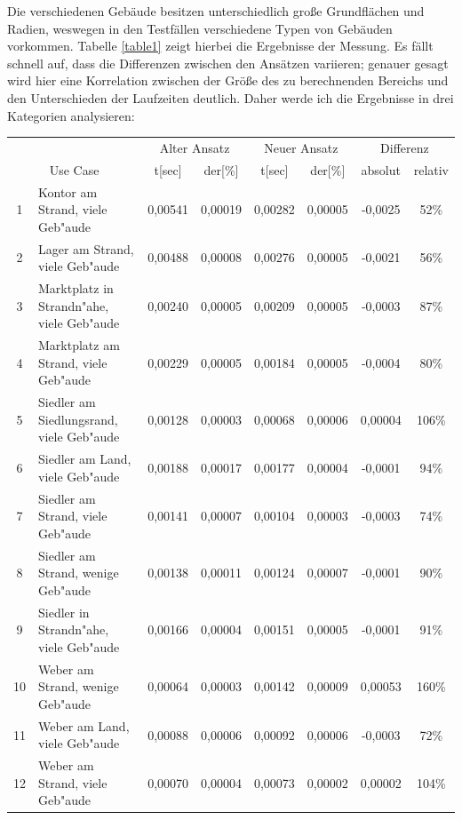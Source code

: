 \documentclass[%
			paper=a4,%
			DIV12,
			liststotoc,
			bibtotoc,
			draft=false,%
			titlepage,
			numbers=noendperiod
			]{scrartcl}
\begin{document}
Die verschiedenen Gebäude besitzen unterschiedlich große Grundflächen und Radien, weswegen
in den Testfällen verschiedene Typen von Gebäuden vorkommen.
Tabelle \ref{table1} zeigt hierbei die Ergebnisse der Messung.
Es fällt schnell auf, dass die Differenzen zwischen den Ansätzen variieren;
genauer gesagt wird hier eine Korrelation zwischen der Größe des zu berechnenden Bereichs und den Unterschieden der Laufzeiten deutlich. Daher werde ich die Ergebnisse in drei Kategorien analysieren:



\begin{center}
	\begin{table}[htpb]
		\begin{tabularx}{\textwidth}{|cX|cc|cc|cc|}
			\hline
			& & \multicolumn{2}{c|}{Alter Ansatz} & \multicolumn{2}{c|}{Neuer Ansatz} & \multicolumn{2}{c|}{Differenz}\\
			\multicolumn{2}{|c|}{Use Case} & t[sec] & der[\%] & t[sec] & der[\%] & absolut & relativ \\
			\hline
1 & Kontor am Strand, viele Geb"aude & 0,00541 & 0,00019 & 0,00282 & 0,00005 & -0,0025 & 52\%\\
2 & Lager am Strand, viele Geb"aude & 0,00488 & 0,00008 & 0,00276 & 0,00005 & -0,0021 & 56\%\\
3 & Marktplatz in Strandn"ahe, viele Geb"aude & 0,00240 & 0,00005 & 0,00209 & 0,00005 & -0,0003 & 87\%\\
4 & Marktplatz am Strand, viele Geb"aude & 0,00229 & 0,00005 & 0,00184 & 0,00005 & -0,0004 & 80\%\\
5 & Siedler am Siedlungsrand, viele Geb"aude & 0,00128 & 0,00003 & 0,00068 & 0,00006 & 0,00004 & 106\%\\
6 & Siedler am Land, viele Geb"aude & 0,00188 & 0,00017 & 0,00177 & 0,00004 & -0,0001 & 94\%\\
7 & Siedler am Strand, viele Geb"aude & 0,00141 & 0,00007 & 0,00104 & 0,00003 & -0,0003 & 74\%\\
8 & Siedler am Strand, wenige Geb"aude & 0,00138 & 0,00011 & 0,00124 & 0,00007 & -0,0001 & 90\%\\
9 & Siedler in Strandn"ahe, viele Geb"aude & 0,00166 & 0,00004 & 0,00151 & 0,00005 & -0,0001 & 91\%\\
10 & Weber am Strand, wenige Geb"aude & 0,00064 & 0,00003 & 0,00142 & 0,00009 & 0,00053 & 160\%\\
11 & Weber am Land, viele Geb"aude & 0,00088 & 0,00006 & 0,00092 & 0,00006 & -0,0003 & 72\%\\
12 & Weber am Strand, viele Geb"aude & 0,00070 & 0,00004 & 0,00073 & 0,00002 & 0,00002 & 104\%\\


\end{tabularx}
\end{table}
\end{center}
\end{document}
